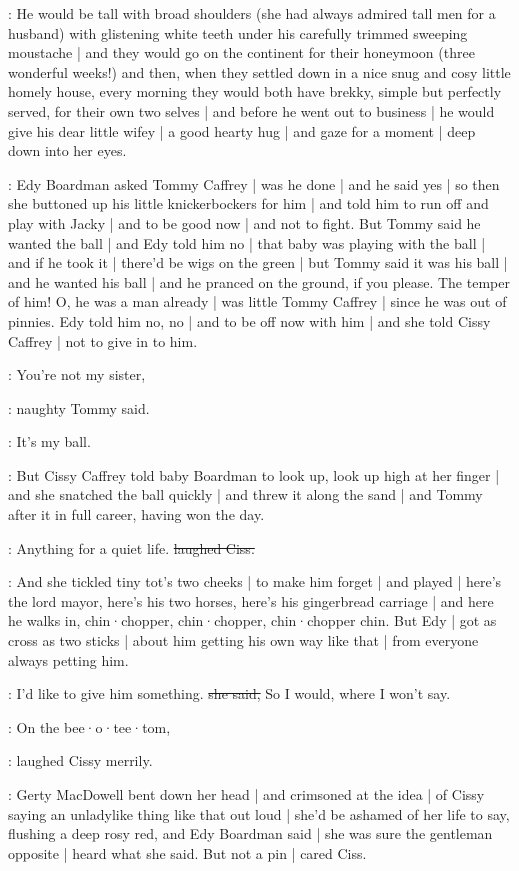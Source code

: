\gertyNovel:
He would be tall with broad shoulders
(she had always admired tall men for a husband)
with glistening white teeth
under his carefully trimmed sweeping moustache |
and they would go on the continent
for their honeymoon
(three wonderful weeks!)
and then,
when they settled down in a nice snug and cosy little homely house,
every morning they would both have brekky,%
simple but perfectly served,
for their own two selves |
and before he went out to business |
he would give his dear little wifey |
a good hearty hug |
and gaze for a moment |
deep down into her eyes.

:
Edy Boardman asked Tommy Caffrey |
was he done |
and he said yes |
so then she buttoned up his little knickerbockers for him |
and told him to run off
and play with Jacky |
and to be good now |
and not to fight.
But Tommy said he wanted the ball |
and Edy told him no |
that baby was playing with the ball |
and if he took it |
there'd be wigs on the green |
but Tommy said it was his ball |
and he wanted his ball |
and he pranced on the ground,
if you please.
The temper of him!
O, he was a man already |
was little Tommy Caffrey |
since he was out of pinnies.%
Edy told him no, no |
and to be off now with him |
and she told Cissy Caffrey |
not to give in to him.

\tommy:
You're not my sister,

:
naughty Tommy said.

\tommy:
It's my ball.

:
But Cissy Caffrey told baby Boardman to look up,
look up high at her finger |
and she snatched the ball quickly |
and threw it along the sand |
and Tommy after it in full career,
having won the day.

\cissy:
Anything for a quiet life.
\sout{laughed Ciss.}

:
And she tickled tiny tot's two cheeks |
to make him forget |
and played |
here's the lord mayor,
here's his two horses,
here's his gingerbread carriage |
and here he walks in,
chin·chopper,
chin·chopper,
chin·chopper chin.
But Edy |
got as cross as two sticks |%
about him getting his own way like that |
from everyone always petting him.

\edy:
I'd like to give him something.
\sout{she said,}
So I would,
where I won't say.

\cissy:
On the bee·o·tee·tom,

:
laughed Cissy merrily.

\gertyReal:
Gerty MacDowell bent down her head |
and crimsoned at the idea |
of Cissy saying an unladylike thing like that out loud |
she'd be ashamed of her life to say,
flushing a deep rosy red,
and Edy Boardman said |
she was sure the gentleman opposite |
heard what she said.
But not a pin |
cared Ciss.

